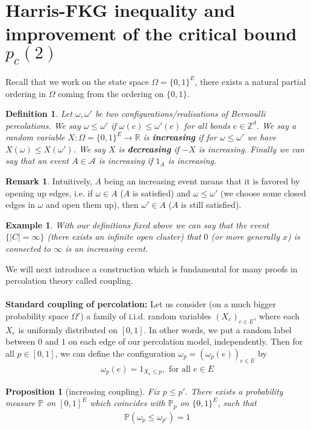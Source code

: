 \documentclass[12pt,a4paper]{article}
\newtheorem{prop}{Proposition}[section]
\newtheorem{defn}{Definition}[section]
\newtheorem{exmp}{Example}[section]
\theoremstyle{definition}
\newtheorem{rem}{Remark}[section]
\begin{document}
\section{Harris-FKG inequality and improvement of the critical bound $p_c(2)$}
Recall that we work on the state space $\Omega = \{0,1\}^E$, there exists a natural partial ordering in $\Omega$ coming from the ordering on $\{0,1\}$.
\begin{defn} Let $\omega, \omega'$ be two configurations/realisations of Bernoulli percolations. We say $\omega \leq \omega'$ if $\omega(e) \leq \omega'(e)$ for all bonds $e \in \mathbb{Z}^d$. We say a random variable $X \colon \Omega= \{0,1\}^E \to \mathbb{R}$ is \textbf{increasing} if for $\omega \leq \omega'$ we have $X(\omega) \leq X(\omega')$. We say $X$ is \textbf{decreasing} if $-X$ is increasing. Finally we can say that an event $A \in \mathcal{A}$ is increasing if $1_A$ is increasing. 
\end{defn}
\begin{rem} Intuitively, $A$ being an increasing event means that it is favored by opening up edges, i.e. if $\omega \in A$ ($A$ is satisfied) and $\omega \leq \omega'$ (we choose some closed edges in $\omega$ and open them up), then $\omega' \in A$ ($A$ is still satisfied). 
\end{rem}
\begin{exmp} With our definitions fixed above we can say that the event $\{|C|= \infty\}$ (there exists an infinite open cluster) that $0$ (or more generally $x$) is connected to $\infty$ is an increasing event. 
\end{exmp}
We will next introduce a construction which is fundamental for many proofs in percolation theory called coupling.\\\\
\textbf{Standard coupling of percolation:} Let us consider (on a much bigger probability space $\Omega'$) a family of i.i.d. random variables $(X_e)_{e \in E}$, where each $X_e$ is uniformly distributed on $[0,1]$. In other words, we put a random label between $0$ and $1$ on each edge of our percolation model, independently. Then for all $p \in [0,1]$, we can define the configuration $\omega_p=( \omega_p(e))_{e \in E}$ by 
\begin{align*}
\omega_p(e) = 1_{X_e \leq p}, \text{ for all } e \in E
\end{align*}
\begin{prop}[increasing coupling] Fix $p \leq p'$. There exists a probability measure $\mathbb{P}$ on $[0,1]^E $ which coincides with $\mathbb{P}_p$ on $\{0,1\}^E$, such that 
\begin{align*}
\mathbb{P}( \omega_p \leq \omega_{p'} ) = 1
\end{align*}
\end{prop}
\end{document}
